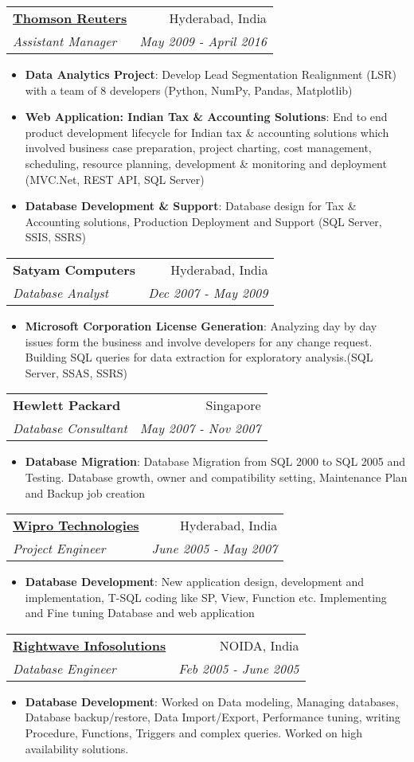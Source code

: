 \documentclass[letterpaper,11pt]{article}
\makeatletter
\newcommand{\resumeItem}[2]{
  \item\small{
    \textbf{#1}{: #2 \vspace{-2pt}}
  }
}
\newcommand{\resumeSubheading}[4]{
  \vspace{-1pt}\item
    \begin{tabular*}{0.97\textwidth}[t]{l@{\extracolsep{\fill}}r}
      \textbf{#1} & #2 \\
      \textit{\small#3} & \textit{\small #4} \\
    \end{tabular*}\vspace{-5pt}
}
\newcommand{\resumeItemListStart}{\begin{itemize}}
\newcommand{\resumeItemListEnd}{\end{itemize}\vspace{-5pt}}
\makeatother
\begin{document}
    \resumeSubheading
      {\href{https://www.thomsonreuters.com}{Thomson Reuters}}{Hyderabad, India}
      {Assistant Manager}{May 2009 - April 2016}
      \resumeItemListStart
        \resumeItem{Data Analytics Project}
          {Develop Lead Segmentation Realignment (LSR) with a team of 8 developers (Python, NumPy, Pandas, Matplotlib)}
        \resumeItem{Web Application: Indian Tax \& Accounting Solutions}
          {End to end product development lifecycle for Indian tax \& accounting solutions which involved business case preparation, project charting, cost management, scheduling, resource planning, development \& monitoring and deployment (MVC.Net, REST API, SQL Server)}
        \resumeItem{Database Development \& Support}
          {Database design for Tax \& Accounting solutions, Production Deployment and Support (SQL Server, SSIS, SSRS)}
      \resumeItemListEnd

    \resumeSubheading
      {Satyam Computers}{Hyderabad, India}
      {Database Analyst}{Dec 2007 - May 2009}
      \resumeItemListStart
        \resumeItem{Microsoft Corporation License Generation}
          {Analyzing day by day issues form the business and involve developers for any change request. Building SQL queries for data extraction for exploratory analysis.(SQL Server, SSAS, SSRS)}
      \resumeItemListEnd

    \resumeSubheading
      {Hewlett Packard}{Singapore}
      {Database Consultant}{May 2007 - Nov 2007}
      \resumeItemListStart
        \resumeItem{Database Migration}
          {Database Migration from SQL 2000 to SQL 2005 and Testing. Database growth, owner and compatibility setting, Maintenance Plan and Backup job creation}
      \resumeItemListEnd


 \resumeSubheading
      {\href{https://www.wipro.com/}{Wipro Technologies}}{Hyderabad, India}
      {Project Engineer}{June 2005 - May 2007}
      \resumeItemListStart
        \resumeItem{Database Development}
          {New application design, development and implementation, T-SQL coding like SP, View, Function etc. Implementing and Fine tuning Database and web application 
}
      \resumeItemListEnd


 \resumeSubheading
      {\href{https://www.rightwave.com/}{Rightwave Infosolutions}}{NOIDA, India}
      {Database Engineer}{Feb 2005 - June 2005}
      \resumeItemListStart
        \resumeItem{Database Development}
          {Worked on Data modeling, Managing databases, Database backup/restore, Data Import/Export, Performance tuning, writing Procedure, Functions, Triggers and complex queries. Worked on high availability solutions. 
}
      \resumeItemListEnd
\end{document}
